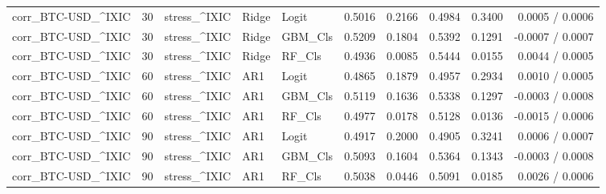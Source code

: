 \begin{table}[H]
\begin{tabular}{lllllrrrrr}
corr_BTC-USD_^IXIC & 30 & stress_^IXIC & Ridge & Logit & 0.5016 & 0.2166 & 0.4984 & 0.3400 & 0.0005 / 0.0006 \\
corr_BTC-USD_^IXIC & 30 & stress_^IXIC & Ridge & GBM_Cls & 0.5209 & 0.1804 & 0.5392 & 0.1291 & -0.0007 / 0.0007 \\
corr_BTC-USD_^IXIC & 30 & stress_^IXIC & Ridge & RF_Cls & 0.4936 & 0.0085 & 0.5444 & 0.0155 & 0.0044 / 0.0005 \\
corr_BTC-USD_^IXIC & 60 & stress_^IXIC & AR1 & Logit & 0.4865 & 0.1879 & 0.4957 & 0.2934 & 0.0010 / 0.0005 \\
corr_BTC-USD_^IXIC & 60 & stress_^IXIC & AR1 & GBM_Cls & 0.5119 & 0.1636 & 0.5338 & 0.1297 & -0.0003 / 0.0008 \\
corr_BTC-USD_^IXIC & 60 & stress_^IXIC & AR1 & RF_Cls & 0.4977 & 0.0178 & 0.5128 & 0.0136 & -0.0015 / 0.0006 \\
corr_BTC-USD_^IXIC & 90 & stress_^IXIC & AR1 & Logit & 0.4917 & 0.2000 & 0.4905 & 0.3241 & 0.0006 / 0.0007 \\
corr_BTC-USD_^IXIC & 90 & stress_^IXIC & AR1 & GBM_Cls & 0.5093 & 0.1604 & 0.5364 & 0.1343 & -0.0003 / 0.0008 \\
corr_BTC-USD_^IXIC & 90 & stress_^IXIC & AR1 & RF_Cls & 0.5038 & 0.0446 & 0.5091 & 0.0185 & 0.0026 / 0.0006 \\
\bottomrule
\end{tabular}
\end{table}